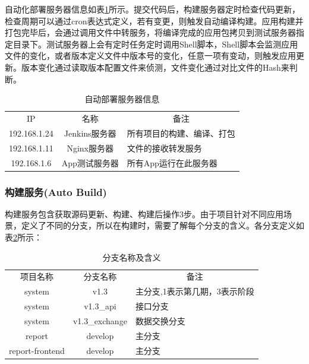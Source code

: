 \documentclass{book}
\begin{document}
自动化部署服务器信息如表\ref{table:databaseconnectionpool}所示。提交代码后，构建服务器定时检查代码更新，检查周期可以通过cron表达式定义，若有变更，则触发自动编译构建。应用构建并打包完毕后，会通过调用文件中转服务，将编译完成的应用包拷贝到测试服务器指定目录下。测试服务器上会有定时任务定时调用Shell脚本，Shell脚本会监测应用文件的变化，或者版本定义文件中版本号的变化，任意一项有变动，则触发应用更新。版本变化通过读取版本配置文件来侦测，文件变化通过对比文件的Hash来判断。

\begin{table}[htbp]
	\caption{自动部署服务器信息}
	\label{table:databaseconnectionpool}
	\begin{center}
		\begin{tabular}{|c|c|p{7cm}|}
			\hline
			\multirow{1}{*}{IP}
			& \multicolumn{1}{c|}{名称} 
			& \multicolumn{1}{c|}{备注}\\			
			\cline{1-3}
			192.168.1.24 &  Jenkins服务器  & 所有项目的构建、编译、打包 \\
			\hline
			192.168.1.11 & Nginx服务器 & 文件的接收转发服务 \\
			\hline
			192.168.1.6 & App测试服务器 & 所有App运行在此服务器 \\
			\hline				
		\end{tabular}	
	\end{center}
\end{table}


\subsubsection{构建服务(Auto Build)}

构建服务包含获取源码更新、构建、构建后操作3步。由于项目针对不同应用场景，定义了不同的分支，所以在构建时，需要了解每个分支的含义。各分支定义如表\ref{table:projectbranch}所示：

\begin{table}[htbp]
	\caption{分支名称及含义}
	\label{table:projectbranch}
	\begin{center}
		\begin{tabular}{|c|c|p{5cm}|}
			\hline
			\multirow{1}{*}{项目名称}		 
			& \multicolumn{1}{c|}{分支名称}
			& \multicolumn{1}{c|}{备注}\\			
			\cline{1-3}
			system &  v1.3 & 主分支,1表示第几期，3表示阶段 \\
			\hline
			system & v1.3\_api & 接口分支 \\		
			\hline
			system & v1.3\_exchange & 数据交换分支 \\		
			\hline
			report & develop & 主分支 \\		
			\hline
			report-frontend & develop & 主分支 \\		
			\hline							
		\end{tabular}	
	\end{center}
\end{table}
\end{document}
